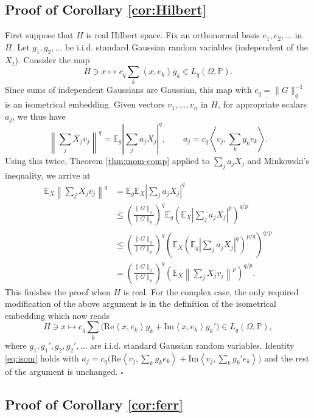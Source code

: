 \documentclass[10pt]{article}
\newcommand{\E}{\mathbb{E}}
\newcommand{\1}{\textbf{1}}
\newcommand{\scal}[2]{\!\left\langle #1, #2 \right\rangle\!}
\theoremstyle{remark}
\theoremstyle{definition}
\begin{document}
\subsection{Proof of Corollary \ref{cor:Hilbert}}

First suppose that $H$ is real Hilbert space. Fix an orthonormal basis $e_1, e_2, \ldots$ in $H$. Let $g_1, g_2, \ldots$ be i.i.d. standard Gaussian random variables (independent of the $X_j$). Consider the map
\[
H \ni x \mapsto c_q\sum_{k} \scal{x}{e_k}g_k \in L_q(\Omega,\mathbb{P}).
\]
Since sums of independent Gaussians are Gaussian, this map with $c_q = \|G\|_q^{-1}$ is an isometrical embedding. Given vectors $v_1,\ldots, v_n$ in $H$, for appropriate scalars $a_j$, we thus have 
\begin{equation}\label{eq:isom}
\left\|\sum_{j} X_jv_j\right\|^q = \E_g\left|\sum_j a_jX_j\right|^q, \qquad  a_j = c_q\scal{v_j}{\sum_{k}g_ke_k}.
\end{equation}
Using this twice, Theorem \ref{thm:mom-comp} applied to $\sum_j a_jX_j$ and Minkowski's inequality, we arrive at
\begin{align*}
\E_X\left\|\sum_{j} X_jv_j\right\|^q &= \E_g\E_X\left|\sum_j a_jX_j\right|^q \\
&\leq \left(\frac{\|G\|_q}{\|G\|_p}\right)^{q}\E_g\left(\E_X\left|\sum_j a_jX_j\right|^p\right)^{q/p} \\
&\leq \left(\frac{\|G\|_q}{\|G\|_p}\right)^{q}\left(\E_X\left(\E_g\left|\sum_j a_jX_j\right|^q\right)^{p/q}\right)^{q/p} \\
&= \left(\frac{\|G\|_q}{\|G\|_p}\right)^{q}\left(\E_X\left\|\sum_j X_jv_j\right\|^p\right)^{q/p}.
\end{align*}
This finishes the proof when $H$ is real. For the complex case, the only required modification of the above argument is in the definition of the isometrical embedding which now reads
\[
H \ni x \mapsto c_q\sum_{k} \Big(\text{Re}\scal{x}{e_k}g_k +\text{Im}\scal{x}{e_k}g_k'\Big)  \in L_q(\Omega,\mathbb{P}),
\]
where $g_1, g_1', g_2, g_2', \ldots$ are i.i.d. standard Gaussian random variables. Identity \eqref{eq:isom} holds with $a_j = c_q\Big(\text{Re}\scal{v_j}{\sum_{k}g_ke_k} + \text{Im}\scal{v_j}{\sum_{k}g_k'e_k}\Big)$ and the rest of the argument is unchanged.
\hfill$\square$


\subsection{Proof of Corollary \ref{cor:ferr}}
\end{document}
